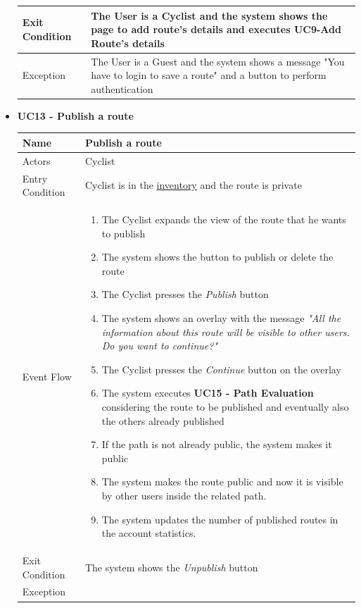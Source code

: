 \begin{itemize}
\begin{tabular}{|p{7cm}|p{7cm}|}
Exit Condition  & The User is a Cyclist and the system shows the page to add route's details and executes \textbf{UC9-Add Route’s details } \\ \hline
Exception       & The User is a Guest and the system shows a message "You have to login to save a route" and a button to perform authentication
\\ \hline
\end{tabular}
\newpage
\item \textbf{UC13 - Publish a route}\par\smallskip
\noindent
\begin{tabular}{|p{7cm}|p{7cm}|}
\hline
Name            & Publish a route \\ \hline
Actors          & Cyclist \\ \hline
Entry Condition & Cyclist is in the \hyperref[fig:Inventory]{ inventory} and the route is private\\ \hline
Event Flow      &
\begin{enumerate}
    \item The Cyclist expands the view of the route that he wants to publish  
    \item The system shows the button to publish or delete the route 
    \item The Cyclist presses the \textit{Publish} button
    \item The system shows an overlay with the message \textit{"All the information about this route will be visible to other users. Do you want to continue?"} 
    \item The Cyclist presses the \textit{Continue} button on the overlay
    \item The system executes \textbf{UC15 - Path Evaluation} considering the route to be published and eventually also the others already published
    \item If the path is not already public, the system makes it public
    \item The system makes the route public and now it is visible by other users inside the related path.
    \item The system updates the number of published routes in the account statistics.
\end{enumerate}
\\ \hline
Exit Condition  &  The system shows the \textit{Unpublish} button\\ \hline
Exception       &
\\ \hline
\end{tabular}

\end{itemize}

